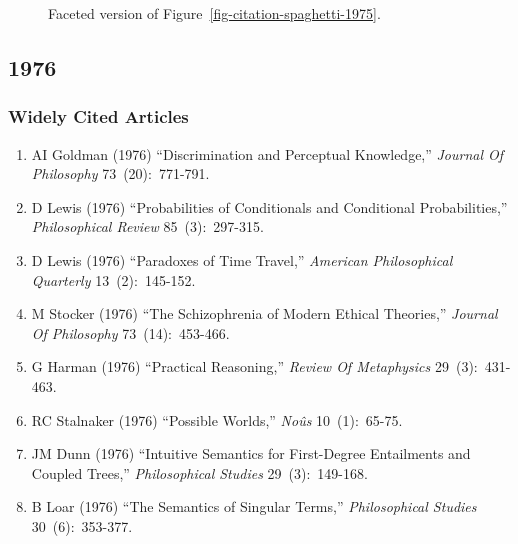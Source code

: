 \documentclass[
  10pt,
  letterpaper,
  DIV=11,
  numbers=noendperiod,
  twoside]{scrartcl}
\providecommand{\tightlist}{%
  \setlength{\itemsep}{0pt}\setlength{\parskip}{0pt}}\usepackage{longtable,booktabs,array}
\begin{document}
\begin{figure}


\caption{\label{fig-citation-facet-1975}Faceted version of
Figure~\ref{fig-citation-spaghetti-1975}.}

\end{figure}%

\newpage

\subsection{1976}\label{sec-s1976}

\subsubsection*{Widely Cited Articles}\label{widely-cited-articles-20}

\begin{enumerate}
\def\labelenumi{\arabic{enumi}.}
\tightlist
\item
  AI Goldman (1976) ``Discrimination and Perceptual Knowledge,''
  \emph{Journal Of Philosophy} 73~(20):~771-791.
\item
  D Lewis (1976) ``Probabilities of Conditionals and Conditional
  Probabilities,'' \emph{Philosophical Review} 85~(3):~297-315.
\item
  D Lewis (1976) ``Paradoxes of Time Travel,'' \emph{American
  Philosophical Quarterly} 13~(2):~145-152.
\item
  M Stocker (1976) ``The Schizophrenia of Modern Ethical Theories,''
  \emph{Journal Of Philosophy} 73~(14):~453-466.
\item
  G Harman (1976) ``Practical Reasoning,'' \emph{Review Of Metaphysics}
  29~(3):~431-463.
\item
  RC Stalnaker (1976) ``Possible Worlds,'' \emph{Noûs} 10~(1):~65-75.
\item
  JM Dunn (1976) ``Intuitive Semantics for First-Degree Entailments and
  Coupled Trees,'' \emph{Philosophical Studies} 29~(3):~149-168.
\item
  B Loar (1976) ``The Semantics of Singular Terms,'' \emph{Philosophical
  Studies} 30~(6):~353-377.
\end{enumerate}
\end{document}
